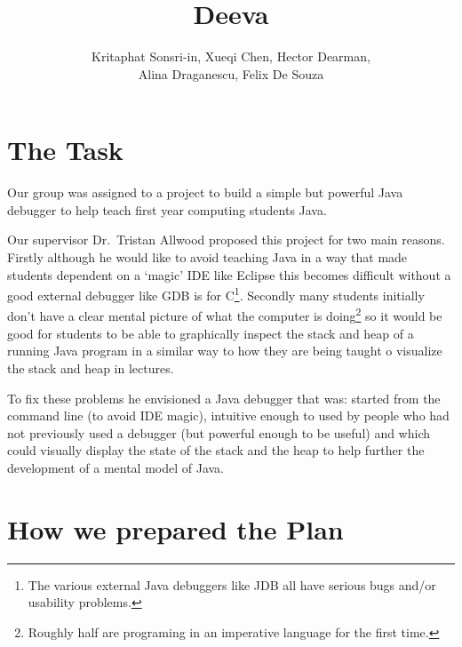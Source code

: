 \documentclass[11pt]{article}
\newcommand{\subtitle}[1]{%
  \posttitle{%
    \par\end{center}
    \begin{center}\large#1\end{center}
    \vskip0.5em}%
}
\begin{document}
\title{Deeva}
\subtitle{Planing Report}
\author{Kritaphat Sonsri-in, Xueqi Chen, Hector Dearman, \\Alina Draganescu, Felix De Souza}

\maketitle

\section{The Task}
Our group was assigned to a project to build a simple but powerful Java debugger to help teach first year computing students Java.

Our supervisor Dr.~Tristan Allwood proposed this project for two main reasons.
Firstly although he would like to avoid teaching Java in a way that made students dependent on a `magic' IDE like Eclipse this becomes difficult without a good external debugger like GDB is for C\footnote{The various external Java debuggers like JDB all have serious bugs and/or usability problems.}.
Secondly many students initially don't have a clear mental picture of what the computer is doing\footnote{Roughly half are programing in an imperative language for the first time.} so it would be good for students to be able to graphically inspect the stack and heap of a running Java program in a similar way to how they are being taught o visualize the stack and heap in lectures.

To fix these problems he envisioned a Java debugger that was: started from the command line (to avoid IDE magic), intuitive enough to used by people who had not previously used a debugger (but powerful enough to be useful) and which could visually display the state of the stack and the heap to help further the development of a mental model of Java.



\section{How we prepared the Plan}
\end{document}
